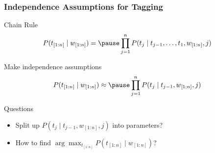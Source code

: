 \begin{frame}
\frametitle{Independence Assumptions for Tagging}
\begin{block}{Chain Rule}
\[ P( t_{[1:n]} \mid w_{[1:n]}) = \pause \prod_{j=1}^n P(t_j \mid t_{j-1}, \ldots, t_1, w_{[1:n]}, j) \]
\end{block}
\pause
\begin{block}{Make independence assumptions}
\[ P( t_{[1:n]} \mid w_{[1:n]}) \approx \pause \prod_{j=1}^n P(t_j \mid t_{j-1}, w_{[1:n]}, j) \]
\end{block}
\pause
\begin{block}{Questions}
\begin{itemize}
\item Split up $P(t_j \mid t_{j-1}, w_{[1:n]}, j)$ into parameters?
\item How to find $\arg\max_{t_{[1:n]}} P( t_{[1:n]} \mid w_{[1:n]})$?
\end{itemize}

\end{block}

\end{frame}




